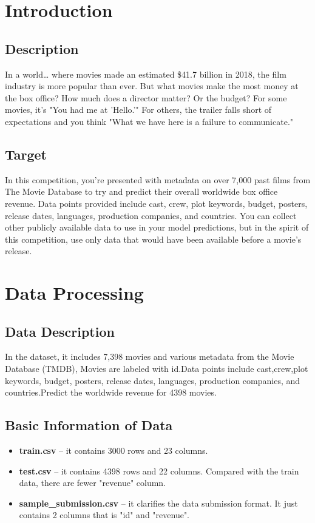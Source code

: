 \section{Introduction}\label{sec-intro}

\subsection{Description}
In a world… where movies made an estimated \$41.7 billion in 2018, the film industry is more popular than ever. 
But what movies make the most money at the box office? How much does a director matter? Or the budget? For some movies, 
it's "You had me at 'Hello.'" For others, the trailer falls short of expectations and you think "What we have here is a
failure to communicate." 
\subsection{Target}
In this competition, you're presented with metadata on over 7,000 past films from The Movie Database to try and predict 
their overall worldwide box office revenue. Data points provided include cast, crew, plot keywords, budget, posters,
 release dates, languages, production companies, and countries. You can collect other publicly available data to use 
 in your model predictions, but in the spirit of this competition, use only data that would have been available before 
 a movie's release. 

 \section{Data Processing} \label{sec-preliminaries}
 \subsection{Data Description}
 In the dataset, it includes 7,398 movies and various metadata from the Movie
Database (TMDB), Movies are labeled with id.Data points include cast,crew,plot keywords, budget, posters, release dates, 
languages, production companies, and countries.Predict the worldwide revenue for 4398 movies.

\subsection{Basic Information of Data}
\begin{itemize}
	\smallskip
	\item \textbf{train.csv} -- it contains 3000 rows and 23 columns.
	\smallskip
	\item \textbf{test.csv} -- it contains 4398 rows and 22 columns. Compared with the train data, there are fewer "revenue" column.
	\smallskip
	\item \textbf{sample\_submission.csv} -- it clarifies the data submission format. It just contains 2 columns that is "id" and "revenue".
\end{itemize}
